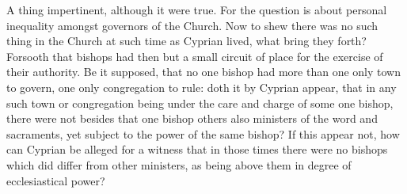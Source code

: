 A thing impertinent, although it were true. For the  question is about personal inequality amongst governors of the Church.
 Now to shew there was no such thing in the Church at such time as Cyprian lived, what bring they forth? Forsooth that bishops had then but a small circuit of place for the exercise of their authority. Be it supposed, that no one bishop had more than one only town to govern, one only congregation to rule: doth it by Cyprian appear, that in any such town or congregation being under the care and charge of some one bishop, there were not besides that one bishop others also ministers of the word and sacraments, yet subject to the power of the same bishop? If this appear not, how can Cyprian be alleged for a witness that in those times there were no bishops which did differ from other ministers, as being above them in degree of ecclesiastical power?

